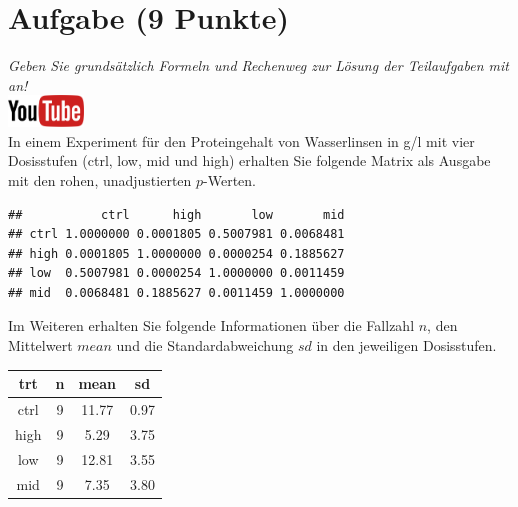 \documentclass[a4paper, 9pt]{scrartcl}\usepackage[]{graphicx}\usepackage[]{xcolor}
\makeatletter
\newenvironment{kframe}{%
 \def\at@end@of@kframe{}%
 \ifinner\ifhmode%
  \def\at@end@of@kframe{\end{minipage}}%
  \begin{minipage}{\columnwidth}%
 \fi\fi%
 \def\FrameCommand##1{\hskip\@totalleftmargin \hskip-\fboxsep
 \colorbox{shadecolor}{##1}\hskip-\fboxsep
     \hskip-\linewidth \hskip-\@totalleftmargin \hskip\columnwidth}%
 \MakeFramed {\advance\hsize-\width
   \@totalleftmargin\z@ \linewidth\hsize
   \@setminipage}}%
 {\par\unskip\endMakeFramed%
 \at@end@of@kframe}
\newenvironment{knitrout}{}{} %
\makeatother
\begin{document}
 
\clearpage

\section{Aufgabe \hfill (9 Punkte)}

\textit{Geben Sie grunds{\"a}tzlich Formeln und Rechenweg zur L{\"o}sung der
  Teilaufgaben mit an!} \\[1Ex]

 \hfill\href{https://youtu.be/RagTFFKFbFg}{\includegraphics[width =
   2cm]{img/youtube}}\\[1Ex]



 
 In einem Experiment f{\"u}r den Proteingehalt von Wasserlinsen in g/l mit vier
 Dosisstufen (ctrl, low, mid und high) erhalten Sie folgende Matrix als
 \Rlogo Ausgabe mit den rohen, unadjustierten $p$-Werten.



\begin{knitrout}
\color{fgcolor}\begin{kframe}
\begin{verbatim}
##           ctrl      high       low       mid
## ctrl 1.0000000 0.0001805 0.5007981 0.0068481
## high 0.0001805 1.0000000 0.0000254 0.1885627
## low  0.5007981 0.0000254 1.0000000 0.0011459
## mid  0.0068481 0.1885627 0.0011459 1.0000000
\end{verbatim}
\end{kframe}
\end{knitrout}

Im Weiteren erhalten Sie folgende Informationen {\"u}ber die Fallzahl $n$, den
Mittelwert $mean$ und die Standardabweichung $sd$ in den jeweiligen Dosisstufen.

\begin{knitrout}
\color{fgcolor}\begin{table}[!h]
\centering
\begin{tabular}{cccc}
\toprule
trt & n & mean & sd\\
\midrule
ctrl & 9 & 11.77 & 0.97\\
high & 9 & 5.29 & 3.75\\
low & 9 & 12.81 & 3.55\\
mid & 9 & 7.35 & 3.80\\
\bottomrule
\end{tabular}
\end{table}

\end{knitrout}
\end{document}
